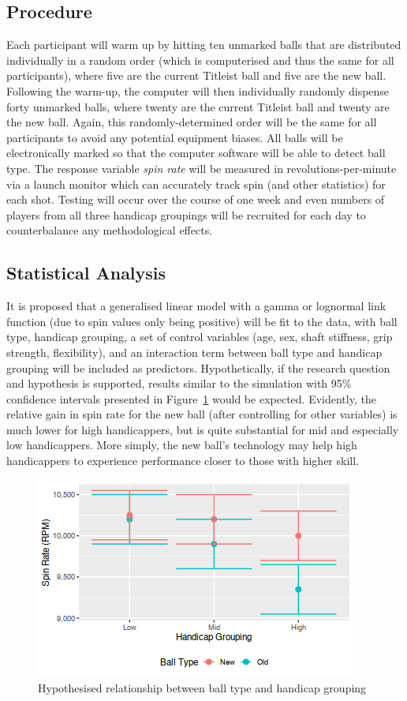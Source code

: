 \documentclass{article}
\begin{document}
\subsection*{Procedure}

Each participant will warm up by hitting ten unmarked balls that are distributed individually in a random order (which is computerised and thus the same for all participants), where five are the current Titleist ball and five are the new ball. 
Following the warm-up, the computer will then individually randomly dispense forty unmarked balls, where twenty are the current Titleist ball and twenty are the new ball. 
Again, this randomly-determined order will be the same for all participants to avoid any potential equipment biases.
All balls will be electronically marked so that the computer software will be able to detect ball type. 
The response variable \textit{spin rate} will be measured in revolutions-per-minute via a launch monitor which can accurately track spin (and other statistics) for each shot. 
Testing will occur over the course of one week and even numbers of players from all three handicap groupings will be recruited for each day to counterbalance any methodological effects.

\subsection*{Statistical Analysis}

It is proposed that a generalised linear model with a gamma or lognormal link function (due to spin values only being positive) will be fit to the data, with ball type, handicap grouping, a set of control variables (age, sex, shaft stiffness, grip strength, flexibility), and an interaction term between ball type and handicap grouping will be included as predictors. 
Hypothetically, if the research question and hypothesis is supported, results similar to the simulation with 95\% confidence intervals presented in Figure~\ref{fig:expectations} would be expected.
Evidently, the relative gain in spin rate for the new ball (after controlling for other variables) is much lower for high handicappers, but is quite substantial for mid and especially low handicappers. 
More simply, the new ball's technology may help high handicappers to experience performance closer to those with higher skill.

\begin{figure}[h]
    \centering
    \includegraphics[max width=\linewidth, scale=0.53]{expectations}
    \caption{\label{fig:expectations}Hypothesised relationship between ball type and handicap grouping}
\end{figure}
\end{document}

